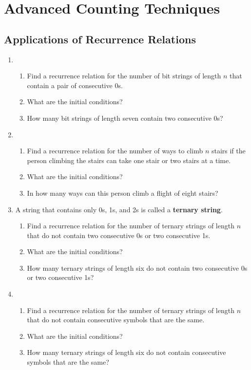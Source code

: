 \documentclass{../../cls/sig-alternate-05-2015}
\begin{document}
\section{Advanced Counting Techniques}
\subsection{Applications of Recurrence Relations}
\begin{enumerate}
\item \begin{enumerate}
    \item Find a recurrence relation for the number of bit strings
    of length $n$ that contain a pair of consecutive $0$s.
    \item What are the initial conditions?
    \item How many bit strings of length seven contain two
    consecutive $0$s?
\end{enumerate}

\item \begin{enumerate}
    \item Find a recurrence relation for the number of ways to
    climb $n$ stairs if the person climbing the stairs can take
    one stair or two stairs at a time.
    \item What are the initial conditions?
    \item In how many ways can this person climb a flight of
    eight stairs?
\end{enumerate}
    
\item A string that contains only 0s, 1s, and 2s is called a \textbf{ternary string}. \begin{enumerate}
    \item Find a recurrence relation for the number of ternary
    strings of length $n$ that do not contain two consecutive
    0s or two consecutive 1s.
    \item What are the initial conditions?
    \item How many ternary strings of length six do not contain
    two consecutive 0s or two consecutive 1s?
\end{enumerate}

\item \begin{enumerate}
    \item Find a recurrence relation for the number of ternary
    strings of length $n$ that do not contain consecutive
    symbols that are the same.
    \item What are the initial conditions?
    \item How many ternary strings of length six do not contain
    consecutive symbols that are the same?
\end{enumerate}


\end{enumerate}
\end{document}
